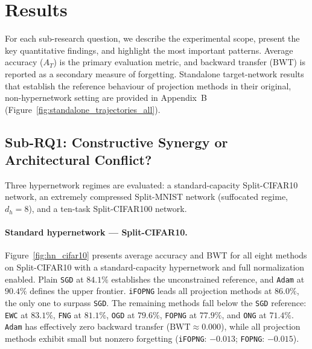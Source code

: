 \section{Results}
\label{sec:results}

For each sub-research question, we describe the experimental scope, present the key
quantitative findings, and highlight the most important patterns. 
Average accuracy ($A_T$) is the primary evaluation metric, and backward transfer 
($\mathrm{BWT}$) is reported as a secondary measure of forgetting. Standalone target-network 
results that establish the reference behaviour of projection methods in their original, 
non-hypernetwork setting are provided in Appendix~B (Figure~\ref{fig:standalone_trajectories_all}).

\subsection{Sub-RQ1: Constructive Synergy or Architectural Conflict?}
\label{sec:results_rq1}

Three hypernetwork regimes are evaluated: a standard-capacity Split-CIFAR10 network, an extremely compressed Split-MNIST network (suffocated regime, $d_h = 8$), and a ten-task Split-CIFAR100 network.

\paragraph{Standard hypernetwork --- Split-CIFAR10.}
Figure~\ref{fig:hn_cifar10} presents average accuracy and BWT for all eight methods on Split-CIFAR10 with a standard-capacity hypernetwork and full normalization enabled.
Plain \texttt{SGD} at $84.1\%$ establishes the unconstrained reference, and \texttt{Adam} at $90.4\%$ defines the upper frontier.
\texttt{iFOPNG} leads all projection methods at $86.0\%$, the only one to surpass \texttt{SGD}.
The remaining methods fall below the \texttt{SGD} reference: \texttt{EWC} at $83.1\%$, \texttt{FNG} at $81.1\%$, \texttt{OGD} at $79.6\%$, \texttt{FOPNG} at $77.9\%$, and \texttt{ONG} at $71.4\%$.
\texttt{Adam} has effectively zero backward transfer ($\mathrm{BWT} \approx 0.000$), while all projection methods exhibit small but nonzero forgetting (\texttt{iFOPNG}: $-0.013$; \texttt{FOPNG}: $-0.015$).

